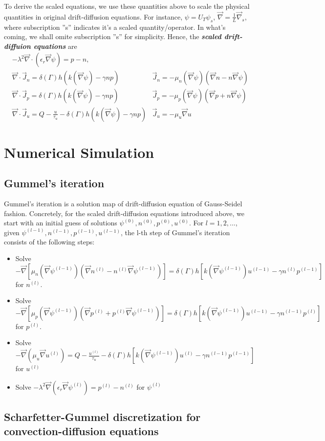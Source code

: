 \documentclass{article}
\newcommand{\grad}{\overrightarrow{\nabla}}
\newcommand{\Jn}{\overrightarrow{J}_n}
\newcommand{\Jp}{\overrightarrow{J}_p}
\newcommand{\Ju}{\overrightarrow{J}_u}
\begin{document}
 To derive the scaled equations, we use these quantities above to scale the physical quantities in original 
 drift-diffusion equations. For instance,
 $\psi = U_T \psi_s$, $\grad = \frac{1}{L} \grad_s$, where subscription ''s'' indicates it's a scaled 
 quantity/operator. In what's coming, we shall omite subscription ''s'' for simplicity. Hence, the {\it\bf scaled 
 drift-diffuion equations} are
 \begin{align}
 &-\lambda^2 \grad \cdot \left( \epsilon_r \grad\psi\right) = p - n,
   & \\
 &\grad \cdot \Jn = \delta(\Gamma) h\left( k(\grad\psi) - \gamma np \right)
   & \Jn = -\mu_n(\grad\psi) \left(\grad n - n\grad\psi \right)\\
 &\grad \cdot \Jp = \delta(\Gamma) h\left( k(\grad\psi) - \gamma np \right) 
   & \Jp = -\mu_p(\grad\psi) \left(\grad p + n\grad\psi \right)\\
 &\grad \cdot \Ju = Q - \frac{u}{\tau_u} - \delta(\Gamma) h\left( k(\grad\psi) - \gamma np \right)
   & \Ju = -\mu_u \grad u
 \end{align}


\section{Numerical Simulation}
 \subsection{Gummel's iteration}
 Gummel's iteration is a solution map of drift-diffusion equation of Gauss-Seidel fashion. Concretely, for the 
 scaled drift-diffusion equations introduced above, we start with an initial guess of solutions $\psi^{(0)}, 
 n^{(0)}, p^{(0)}, u^{(0)}$. For $l = 1,2,...$, given $\psi^{(l-1)}, n^{(l-1)}, p^{(l-1)}, u^{(l-1)}$, 
 the l-th step of Gummel's iteration consists of the following steps:
 \begin{itemize}
  \item Solve 
    $-\grad \left[ \mu_n(\grad\psi^{(l-1)}) \left( \grad n^{(l)} - n^{(l)}\grad \psi^{(l-1)} \right) \right] 
    = \delta(\Gamma) h\left[ k(\grad\psi^{(l-1)})u^{(l-1)} - \gamma n^{(l)}p^{(l-1)} \right]$
    for $n^{(l)}$.
  \item Solve
    $-\grad \left[ \mu_p(\grad\psi^{(l-1)}) \left( \grad p^{(l)} + p^{(l)} \grad \psi^{(l-1)} \right) \right]
    = \delta(\Gamma) h\left[ k(\grad\psi^{(l-1)})u^{(l-1)} - \gamma n^{(l-1)}p^{(l)} \right]$
    for $p^{(l)}$.
  \item Solve
    $-\grad \left( \mu_u \grad u^{(l)} \right) 
    = Q - \frac{u^{(l)}}{\tau_u} - \delta(\Gamma) h\left[ k(\grad\psi^{(l-1)})u^{(l)} - \gamma n^{(l-1)}p^{(l-1)} \right]$
    for $u^{(l)}$
  \item Solve
    $-\lambda^2 \grad \left( \epsilon_r \grad \psi^{(l)} \right)
    = p^{(l)} - n^{(l)}$
    for $\psi^{(l)}$
 \end{itemize}

 \subsection{Scharfetter-Gummel discretization for convection-diffusion equations}
 
\end{document}
